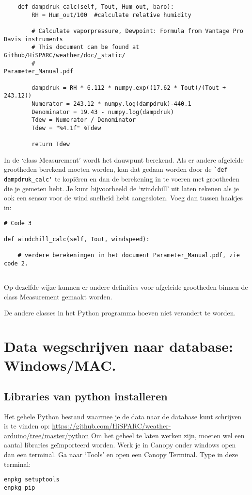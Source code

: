 \begin{verbatim}
    def dampdruk_calc(self, Tout, Hum_out, baro):
        RH = Hum_out/100  #calculate relative humidity

        # Calculate vaporpressure, Dewpoint: Formula from Vantage Pro Davis instruments
        # This document can be found at Github/HiSPARC/weather/doc/_static/
        #                                               Parameter_Manual.pdf

        dampdruk = RH * 6.112 * numpy.exp((17.62 * Tout)/(Tout + 243.12))
        Numerator = 243.12 * numpy.log(dampdruk)-440.1
        Denominator = 19.43 - numpy.log(dampdruk)
        Tdew = Numerator / Denominator
        Tdew = "%4.1f" %Tdew

        return Tdew

\end{verbatim}

In de `class Measurement' wordt het dauwpunt berekend. Als er andere afgeleide grootheden 
berekend moeten worden, kan dat gedaan worden door de \verb|`def dampdruk_calc'| te kopiëren en 
dan de berekening in te voeren met grootheden die je gemeten hebt. Je kunt
bijvoorbeeld de `windchill' uit laten rekenen als je ook een sensor voor de 
wind snelheid hebt aangesloten. Voeg dan tussen haakjes in:

\begin{verbatim}
# Code 3

def windchill_calc(self, Tout, windspeed):
    
    # verdere berekeningen in het document Parameter_Manual.pdf, zie code 2.
    
\end{verbatim}        

Op dezelfde wijze kunnen er andere definities voor afgeleide grootheden
binnen de class Measurement gemaakt worden. 

De andere classes in het Python programma hoeven niet verandert te worden.


\section{Data wegschrijven naar \hisparc database: Windows/MAC.}

\subsection{Libraries van python installeren}

Het gehele Python bestand waarmee je de data naar de \hisparc database kunt schrijven 
is te vinden op:
\url{https://github.com/HiSPARC/weather-arduino/tree/master/python}
Om het geheel te laten werken zijn, moeten wel een aantal libraries geïmporteerd worden.
Werk je in Canopy onder windows open dan een terminal. Ga naar `Tools' en open 
een Canopy Terminal.
Type in deze terminal:
\begin{verbatim}
enpkg setuptools
enpkg pip
\end{verbatim}

